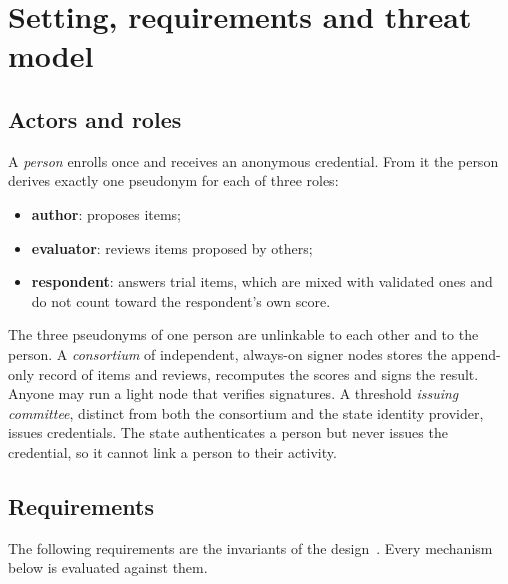 \section{Setting, requirements and threat model}\label{sec:setting}

\subsection{Actors and roles}

A \emph{person} enrolls once and receives an anonymous credential. From it the person derives
exactly one pseudonym for each of three roles:
\begin{itemize}
  \item \textbf{author}: proposes items;
  \item \textbf{evaluator}: reviews items proposed by others;
  \item \textbf{respondent}: answers trial items, which are mixed with validated ones and do not count
    toward the respondent's own score.
\end{itemize}
The three pseudonyms of one person are unlinkable to each other and to the person. A
\emph{consortium} of independent, always-on signer nodes stores the append-only record of items
and reviews, recomputes the scores and signs the result. Anyone may run a light node that
verifies signatures. A threshold \emph{issuing committee}, distinct from both the consortium and
the state identity provider, issues credentials. The state authenticates a person but never
issues the credential, so it cannot link a person to their activity.

\subsection{Requirements}

The following requirements are the invariants of the design~\cite{isegoria-repo}. Every
mechanism below is evaluated against them.

